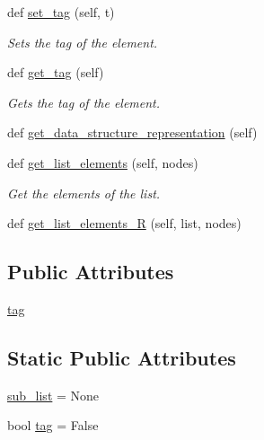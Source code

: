 \begin{DoxyCompactItemize}
def \mbox{\hyperlink{class_bridges_1_1_m_lelement_1_1_m_lelement_a25d6a2e4524e4427b9f540fc41d44508}{set\+\_\+tag}} (self, t)
\begin{DoxyCompactList}\small\item\em Sets the tag of the element. \end{DoxyCompactList}\item 
def \mbox{\hyperlink{class_bridges_1_1_m_lelement_1_1_m_lelement_a20efe494cec340d83415c07b5da8d8dd}{get\+\_\+tag}} (self)
\begin{DoxyCompactList}\small\item\em Gets the tag of the element. \end{DoxyCompactList}\item 
def \mbox{\hyperlink{class_bridges_1_1_m_lelement_1_1_m_lelement_a8b4e8441ab968b46e487c64424954b7e}{get\+\_\+data\+\_\+structure\+\_\+representation}} (self)
\item 
def \mbox{\hyperlink{class_bridges_1_1_m_lelement_1_1_m_lelement_adcb6bb39c380a6a8b2c8b5438dfdd738}{get\+\_\+list\+\_\+elements}} (self, nodes)
\begin{DoxyCompactList}\small\item\em Get the elements of the list. \end{DoxyCompactList}\item 
def \mbox{\hyperlink{class_bridges_1_1_m_lelement_1_1_m_lelement_acee0cb1ef6a83ad38aa41b5be4aa2b1b}{get\+\_\+list\+\_\+elements\+\_\+R}} (self, list, nodes)
\end{DoxyCompactItemize}
\subsection*{Public Attributes}
\begin{DoxyCompactItemize}
\item 
\mbox{\hyperlink{class_bridges_1_1_m_lelement_1_1_m_lelement_adb11c5e159bc78f59daf34b2ae3c5a58}{tag}}
\end{DoxyCompactItemize}
\subsection*{Static Public Attributes}
\begin{DoxyCompactItemize}
\item 
\mbox{\hyperlink{class_bridges_1_1_m_lelement_1_1_m_lelement_ae79f85968687b3c4c72bd56b836d0976}{sub\+\_\+list}} = None
\item 
bool \mbox{\hyperlink{class_bridges_1_1_m_lelement_1_1_m_lelement_ab10db82c80844494948664c11d5ba810}{tag}} = False
\end{DoxyCompactItemize}


